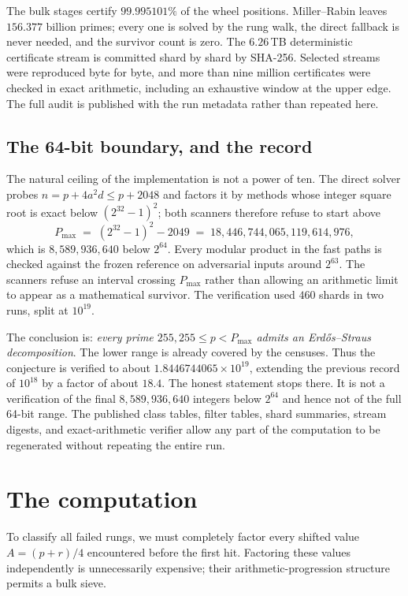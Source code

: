 \documentclass[11pt]{article}
\theoremstyle{definition}
\theoremstyle{remark}
\begin{document}
The bulk stages certify $99.995101\%$ of the wheel positions. Miller--Rabin leaves
$156.377$ billion primes; every one is solved by the rung walk, the direct
fallback is never needed, and the survivor count is zero. The $6.26$\,TB deterministic
certificate stream is committed shard by shard by SHA-256. Selected streams were
reproduced byte for byte, and more than nine million certificates were checked in
exact arithmetic, including an exhaustive window at the upper edge. The full audit is
published with the run metadata rather than repeated here.

\subsection{The 64-bit boundary, and the record}\label{sec:boundary}

The natural ceiling of the implementation is not a power of ten. The direct solver
probes $n = p + 4a^2d \le p + 2048$ and factors it by methods whose integer square
root is exact below $(2^{32}-1)^2$; both scanners therefore refuse to start above
\[
P_{\max} \;=\; (2^{32}-1)^2 - 2049 \;=\; 18{,}446{,}744{,}065{,}119{,}614{,}976,
\]
which is $8{,}589{,}936{,}640$ below $2^{64}$. Every modular product in the fast paths
is checked against the frozen reference on adversarial inputs around $2^{63}$. The
scanners refuse an interval crossing $P_{\max}$ rather than allowing an arithmetic
limit to appear as a mathematical survivor. The verification used $460$ shards in two
runs, split at $10^{19}$.

The conclusion is: \emph{every prime $255{,}255\le p<P_{\max}$ admits an
Erd\H{o}s--Straus decomposition}. The lower range is already covered by the censuses.
Thus the conjecture is verified to about $1.8446744065\times10^{19}$, extending the
previous record of $10^{18}$ \cite{MihneaBogdan2025} by a factor of about $18.4$. The
honest statement stops there. It is not a verification of the final
$8{,}589{,}936{,}640$ integers below $2^{64}$ and hence not of the full 64-bit range.
The published class tables, filter tables, shard summaries, stream digests, and
exact-arithmetic verifier allow any part of the computation to be regenerated without
repeating the entire run.

\section{The computation}\label{sec:computation}

To classify all failed rungs, we must completely factor every shifted value
$A=(p+r)/4$ encountered before the first hit. Factoring these values independently is
unnecessarily expensive; their arithmetic-progression structure permits a bulk sieve.
\end{document}
